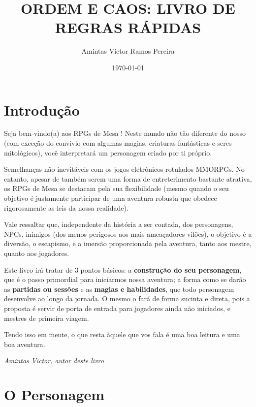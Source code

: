 \documentclass[10pt,twoside,twocolumn]{book}
\title{\section*{ORDEM E CAOS: LIVRO DE REGRAS RÁPIDAS}}
\date{\today}
\author{Amintas Victor Ramos Pereira}
\begin{document}
\selectfont %
\frontmatter
\maketitle
\tableofcontents

\mainmatter
\chapter{Introdução}
Seja bem-vindo(a) aos RPGs de Mesa ! Neste mundo não tão diferente do nosso (com exceção do convívio com algumas magias, criaturas fantásticas e seres mitológicos), você interpretará um personagem criado por ti próprio.
\newline

Semelhanças não inevitáveis com os jogos eletrônicos rotulados MMORPGs. No entanto, apesar de também serem uma forma de entreterimento bastante atrativa, os RPGs de Mesa se destacam pela sua flexibilidade (mesmo quando o seu objetivo é justamente participar de uma aventura robusta que obedece rigorosamente as leis da nossa realidade).
\newline

Vale ressaltar que, independente da história a ser contada, dos personagens, NPCs, inimigos (dos menos perigosos aos mais ameaçadores vilões), o objetivo é a diversão, o escapismo, e a imersão proporcionada pela aventura, tanto aos mestre, quanto aos jogadores.
\newline

Este livro irá tratar de 3 pontos básicos: a \textbf{construção do seu personagem}, que é o passo primordial para iniciarmos nossa aventura; a forma como se darão as \textbf{partidas ou sessões} e as \textbf{magias e habilidades}, que todo personagem desenvolve ao longo da jornada. O mesmo o fará de forma sucinta e direta, pois a proposta é servir de porta de entrada para jogadores ainda não iniciados, e mestres de primeira viagem.
\newline

Tendo isso em mente, o que resta àquele que vos fala é uma boa leitura e uma boa aventura.
\newline

\textit{Amintas Victor, autor deste livro}

\chapter{O Personagem}
\end{document}
